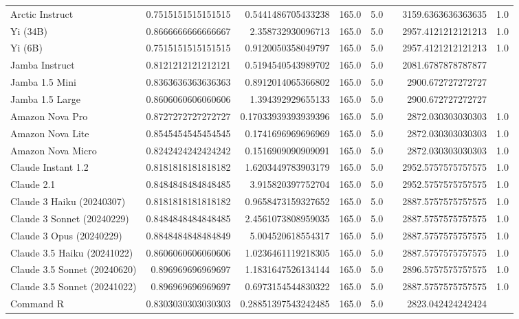 \begin{table}[htp]
{\begin{tabular}{lrrrrrrr}
Arctic Instruct & 0.7515151515151515 & 0.5441486705433238 & 165.0 & 5.0 &  & 3159.6363636363635 & 1.0 \\
Yi (34B) & 0.8666666666666667 & 2.358732930096713 & 165.0 & 5.0 &  & 2957.4121212121213 & 1.0 \\
Yi (6B) & 0.7515151515151515 & 0.9120050358049797 & 165.0 & 5.0 &  & 2957.4121212121213 & 1.0 \\
Jamba Instruct & 0.8121212121212121 & 0.5194540543989702 & 165.0 & 5.0 &  & 2081.6787878787877 &  \\
Jamba 1.5 Mini & 0.8363636363636363 & 0.8912014065366802 & 165.0 & 5.0 &  & 2900.672727272727 &  \\
Jamba 1.5 Large & 0.8606060606060606 & 1.394392929655133 & 165.0 & 5.0 &  & 2900.672727272727 &  \\
Amazon Nova Pro & 0.8727272727272727 & 0.17033939393939396 & 165.0 & 5.0 &  & 2872.030303030303 & 1.0 \\
Amazon Nova Lite & 0.8545454545454545 & 0.1741696969696969 & 165.0 & 5.0 &  & 2872.030303030303 & 1.0 \\
Amazon Nova Micro & 0.8242424242424242 & 0.1516909090909091 & 165.0 & 5.0 &  & 2872.030303030303 & 1.0 \\
Claude Instant 1.2 & 0.8181818181818182 & 1.6203449783903179 & 165.0 & 5.0 &  & 2952.5757575757575 & 1.0 \\
Claude 2.1 & 0.8484848484848485 & 3.915820397752704 & 165.0 & 5.0 &  & 2952.5757575757575 & 1.0 \\
Claude 3 Haiku (20240307) & 0.8181818181818182 & 0.9658473159327652 & 165.0 & 5.0 &  & 2887.5757575757575 & 1.0 \\
Claude 3 Sonnet (20240229) & 0.8484848484848485 & 2.4561073808959035 & 165.0 & 5.0 &  & 2887.5757575757575 & 1.0 \\
Claude 3 Opus (20240229) & 0.8848484848484849 & 5.004520618554317 & 165.0 & 5.0 &  & 2887.5757575757575 & 1.0 \\
Claude 3.5 Haiku (20241022) & 0.8606060606060606 & 1.0236461119218305 & 165.0 & 5.0 &  & 2887.5757575757575 & 1.0 \\
Claude 3.5 Sonnet (20240620) & 0.896969696969697 & 1.1831647526134144 & 165.0 & 5.0 &  & 2896.5757575757575 & 1.0 \\
Claude 3.5 Sonnet (20241022) & 0.896969696969697 & 0.6973154544830322 & 165.0 & 5.0 &  & 2887.5757575757575 & 1.0 \\
Command R & 0.8303030303030303 & 0.28851397543242485 & 165.0 & 5.0 &  & 2823.042424242424 &  \\

\end{tabular}}
\end{table}
